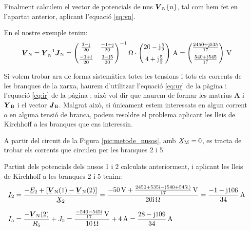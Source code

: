 Finalment
calculem el vector de potencials de nus $\mcmplx{V}\ped{N}\{n\}$, tal
com  hem fet en l'apartat anterior, aplicant l'equació \eqref{eq:vn}.

En el nostre exemple tenim:
\[
   \mcmplx{V}\ped{N} = \mcmplx{Y}\ped{N}^{-1} \mcmplx{J}\ped{N} =
   \begin{pmatrix}
         \frac{3 - \ju}{20}  & \frac{-1 + \ju}{20} \\[2mm]
         \frac{-1 + \ju}{20} & \frac{3 - \ju 5}{20}
   \end{pmatrix} ^{-1}\unit{\ohm} \cdot
   \begin{pmatrix}
            20 - \ju \frac{5}{2} \\[2mm]
            4 + \ju \frac{5}{2}
   \end{pmatrix}\,\unit{A} =
   \begin{pmatrix}
         \frac{2450 + \ju 535}{17} \\[2mm]
         \frac{540  + \ju 545}{17}
   \end{pmatrix}\,\unit{V}
\]

Si volem trobar ara de forma sistemàtica totes les tensions i tots
els corrents   de les branques de la xarxa, haurem d'utilitzar
l'equació \eqref{eq:ur} de la pàgina \pageref{eq:ur} i l'equació
\eqref{eq:ir} de la pàgina \pageref{eq:ir}; això vol dir que haurem
de formar les matrius $\boldsymbol{A}$ i $\mcmplx{Y}\ped{B}$ i el
vector $\mcmplx{J}\ped{B}$. Malgrat això, si únicament estem
interessats en algun corrent o en alguna tensió de branca, podem
resoldre el problema aplicant les lleis de Kirchhoff a les branques
que ens interessin.


\begin{exemple}
    A partir del circuit de la Figura \vref{pic:metode_nusos}, amb
    $\cmplx{X}\ped{M}=0$, es tracta de trobar els corrents que circulen
    per les branques 2 i 5.

    Partint dels potencials dels nusos 1 i 2 calculats anteriorment, i
    aplicant les lleis de Kirchhoff a les branques 2 i 5 tenim:
    \begin{align*}
       \cmplx{I}_2 &= \frac{-\cmplx{E}_2 + [\mcmplx{V}\ped{N}(1) - \mcmplx{V}\ped{N}(2)]}
                      {\cmplx{X}_2} = \frac{\qty{-50}{V} + \frac{\complexnum{2450+j535} - (\complexnum{540+
                      j545})}{17}\,\unit{V}}{\complexqty{j20}{\ohm}} = \frac{-1 - \ju 106}{34}\unit{\,A} \\[1.5ex]
       \cmplx{I}_5 &=  \frac{- \mcmplx{V}\ped{N}(2)}{R_5}  + \cmplx{J}_5 =                       \frac{\frac{\complexnum{-540-j545}}{17}\,\unit{V}}{\qty{10}{\ohm}} + \qty{4}{A} = \frac{28 - \ju 109}{34}\unit{\,A}
    \end{align*}
\end{exemple}

